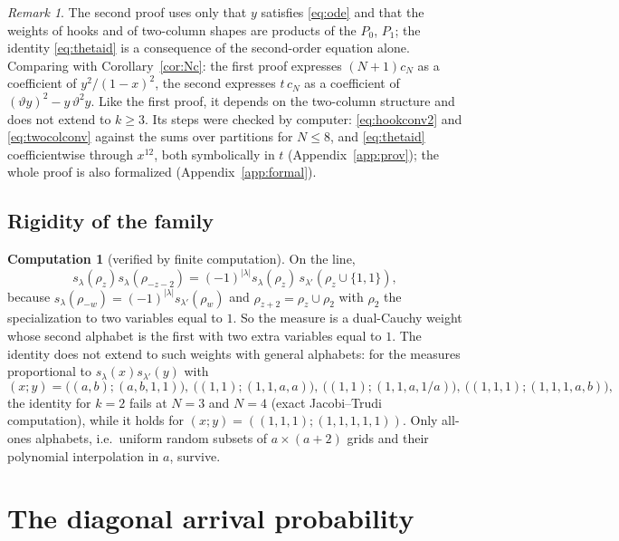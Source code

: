 \documentclass[11pt]{article}
\theoremstyle{definition}
\newtheorem{computation}[theorem]{Computation}
\theoremstyle{remark}
\newtheorem{remark}[theorem]{Remark}
\begin{document}
\begin{remark}
The second proof uses only that $y$ satisfies \eqref{eq:ode} and that the weights of hooks and of two-column shapes are products of the $P_0$, $P_1$; the identity \eqref{eq:thetaid} is a consequence of the second-order equation alone. Comparing with Corollary~\ref{cor:Nc}: the first proof expresses $(N+1)c_N$ as a coefficient of $y^2/(1-x)^2$, the second expresses $t\,c_N$ as a coefficient of $(\vartheta y)^2-y\,\vartheta^2y$. Like the first proof, it depends on the two-column structure and does not extend to $k\ge3$. Its steps were checked by computer: \eqref{eq:hookconv2} and \eqref{eq:twocolconv} against the sums over partitions for $N\le8$, and \eqref{eq:thetaid} coefficientwise through $x^{12}$, both symbolically in $t$ (Appendix~\ref{app:prov}); the whole proof is also formalized (Appendix~\ref{app:formal}).
\end{remark}

\subsection{Rigidity of the family}

\begin{computation}[verified by finite computation]\label{comp:dualrigid}
On the line,
\[
s_\lambda(\rho_z)s_\lambda(\rho_{-z-2})=(-1)^{|\lambda|}s_\lambda(\rho_z)\,s_{\lambda'}(\rho_z\cup\{1,1\}),
\]
because $s_\lambda(\rho_{-w})=(-1)^{|\lambda|}s_{\lambda'}(\rho_w)$ and $\rho_{z+2}=\rho_z\cup\rho_2$ with $\rho_2$ the specialization to two variables equal to $1$. So the measure is a dual-Cauchy weight whose second alphabet is the first with two extra variables equal to $1$. The identity does not extend to such weights with general alphabets: for the measures proportional to $s_\lambda(x)s_{\lambda'}(y)$ with
\[
(x;y)=\bigl((a,b);(a,b,1,1)\bigr),\ \bigl((1,1);(1,1,a,a)\bigr),\ \bigl((1,1);(1,1,a,1/a)\bigr),\ \bigl((1,1,1);(1,1,1,a,b)\bigr),
\]
the identity for $k=2$ fails at $N=3$ and $N=4$ (exact Jacobi--Trudi computation), while it holds for $(x;y)=((1,1,1);(1,1,1,1,1))$. Only all-ones alphabets, i.e.\ uniform random subsets of $a\times(a+2)$ grids and their polynomial interpolation in $a$, survive.
\end{computation}

\section{The diagonal arrival probability}\label{sec:proved}
\end{document}
